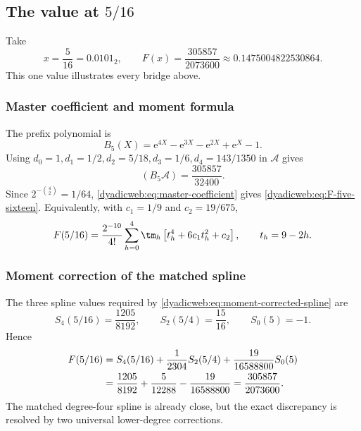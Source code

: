 \documentclass[11pt,oneside]{article}
\theoremstyle{definition}
\theoremstyle{remark}
\newcommand{\e}{\mathrm e}
\begin{document}
\subsection[The value at 5/16]{The value at $5/16$}

Take
\[
 x=\frac5{16}=0.0101_2,
 \qquad
 F(x)=\frac{305857}{2073600}
 \approx0.1475004822530864.                                \label{dyadicweb:eq:F-five-sixteen}
\]
This one value illustrates every bridge above.

\subsubsection{Master coefficient and moment formula}

The prefix polynomial is
\begin{equation}
 B_5(X)=\e^{4X}-\e^{3X}-\e^{2X}+\e^X-1.                  \label{dyadicweb:eq:B5}
\end{equation}
Using
\(
 d_0=1,d_1=1/2,d_2=5/18,d_3=1/6,d_4=143/1350
\)
in $\mathscr A$ gives
\begin{equation}
 [X^4](B_5\mathscr A)=\frac{305857}{32400}.               \label{dyadicweb:eq:B5-coefficient}
\end{equation}
Since $2^{-\binom42}=1/64$, \eqref{dyadicweb:eq:master-coefficient} gives
\eqref{dyadicweb:eq:F-five-sixteen}.  Equivalently, with
$c_1=1/9$ and $c_2=19/675$,
\begin{equation}
 F(5/16)=\frac{2^{-10}}{4!}
 \sum_{h=0}^{4}\tm_h
 \left[t_h^4+6c_1t_h^2+c_2\right],
 \qquad t_h=9-2h.                                         \label{dyadicweb:eq:five-sixteen-moment}
\end{equation}

\subsubsection{Moment correction of the matched spline}

The three spline values required by \eqref{dyadicweb:eq:moment-corrected-spline} are
\begin{equation}
 S_4(5/16)=\frac{1205}{8192},
 \qquad
 S_2(5/4)=\frac{15}{16},
 \qquad
 S_0(5)=-1.                                                \label{dyadicweb:eq:five-sixteen-splines}
\end{equation}
Hence
\begin{align}
 F(5/16)
 &=S_4(5/16)+\frac1{2304}S_2(5/4)
   +\frac{19}{16588800}S_0(5)                             \notag\\
 &=\frac{1205}{8192}+\frac5{12288}-\frac{19}{16588800}
 =\frac{305857}{2073600}.                                 \label{dyadicweb:eq:five-sixteen-correction}
\end{align}
The matched degree-four spline is already close, but the exact discrepancy is resolved by two
universal lower-degree corrections.
\end{document}
